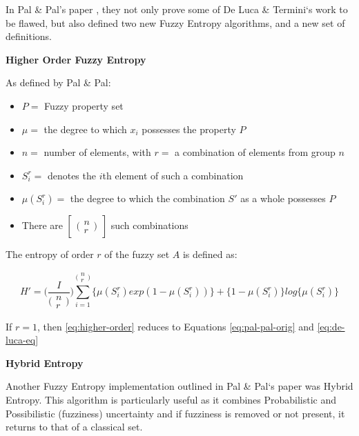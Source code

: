 In Pal \& Pal's paper  \cite{Pal_Pal_1992}, they not only prove some of De Luca \& Termini`s work to be flawed, but also defined two new Fuzzy Entropy algorithms, and a new set of definitions.

\noindent \textbf{Higher Order Fuzzy Entropy}

As defined by Pal \& Pal:

\begin{itemize}
  \item $P = $ Fuzzy property set
  \item $\mu =$ the degree to which $x_i$ possesses the property $P$
  \item $n =$ number of elements, with $r =$ a combination of elements from group $n$
  \item $S^r_i =$ denotes the $i$th element of such a combination
  \item $\mu(S^r_i) =$ the degree to which the combination $S'$ as a whole possesses $P$
  \item There are $\begin{bmatrix} \bigl(\begin{smallmatrix}
  n \\ r
  \end{smallmatrix} \bigr) \end{bmatrix}$ such combinations
\end{itemize}

The entropy of order $r$ of the fuzzy set $A$ is defined as:

\begin{equation} \label{eq:higher-order}
  H' = \bigg(\frac{I}{\bigl(\begin{smallmatrix}
  n \\ r
\end{smallmatrix} \bigr)}\bigg) \displaystyle\sum_{i=1}^{\bigl(\begin{smallmatrix}
  n \\ r
  \end{smallmatrix} \bigr)} \{ \mu(S^r_i)exp(1 - \mu(S^r_i)) \} + \{ 1 - \mu(S^r_i) \}log\{\mu(S^r_i)\}
\end{equation}

If $r = 1$, then \eqref{eq:higher-order} reduces to Equations \eqref{eq:pal-pal-orig} and \eqref{eq:de-luca-eq}

\noindent \textbf{Hybrid Entropy}

Another Fuzzy Entropy implementation outlined in Pal \& Pal`s paper was Hybrid Entropy. This algorithm is particularly useful as it combines Probabilistic and Possibilistic (fuzziness) uncertainty and if fuzziness is removed or not present, it returns to that of a classical set.

